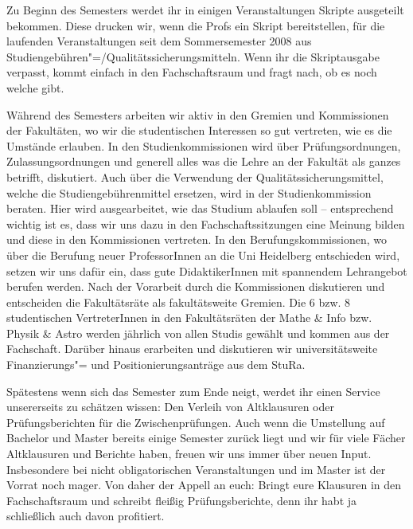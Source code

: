 Zu Beginn des Semesters werdet ihr in einigen Veranstaltungen Skripte ausgeteilt bekommen. Diese drucken wir, wenn die Profs ein Skript bereitstellen, für die laufenden Veranstaltungen seit dem Sommersemester 2008 aus Studiengebühren"=/Qualitätssicherungsmitteln. Wenn ihr die Skriptausgabe verpasst, kommt einfach in den Fachschaftsraum und fragt nach, ob es noch welche gibt.

Während des Semesters arbeiten wir aktiv in den Gremien und Kommissionen der Fakultäten, wo wir die studentischen Interessen so gut vertreten, wie es die Umstände erlauben. In den Studienkommissionen wird über Prüfungsordnungen, Zulassungsordnungen und generell alles was die Lehre an der Fakultät als ganzes betrifft, diskutiert. Auch über die Verwendung der Qualitätssicherungsmittel, welche die Studiengebührenmittel ersetzen, wird in der Studienkommission beraten. Hier wird ausgearbeitet, wie das Studium ablaufen soll -- entsprechend wichtig ist es, dass wir uns dazu in den Fachschaftssitzungen eine Meinung bilden und diese in den Kommissionen vertreten. In den Berufungskommissionen, wo über die Berufung neuer ProfessorInnen an die Uni Heidelberg entschieden wird, setzen wir uns dafür ein, dass gute DidaktikerInnen mit spannendem Lehrangebot berufen werden. Nach der Vorarbeit durch die Kommissionen diskutieren und entscheiden die Fakultätsräte als fakultätsweite Gremien. Die 6 bzw. 8 studentischen VertreterInnen in den Fakultätsräten der Mathe \& Info bzw. Physik \& Astro werden jährlich von allen Studis gewählt und kommen aus der Fachschaft. Darüber hinaus erarbeiten und diskutieren wir universitätsweite Finanzierungs"= und Positionierungsanträge aus dem \gls{StuRa}.

Spätestens wenn sich das Semester zum Ende neigt, werdet ihr einen Service unsererseits zu schätzen wissen: Den Verleih von Altklausuren oder Prüfungsberichten für die Zwischenprüfungen. Auch wenn die Umstellung auf Bachelor und Master bereits einige Semester zurück liegt und wir für viele Fächer Altklausuren und Berichte haben, freuen wir uns immer über neuen Input. Insbesondere bei nicht obligatorischen Veranstaltungen und im Master ist der Vorrat noch mager. Von daher der Appell an euch: Bringt eure Klausuren in den Fachschaftsraum und schreibt fleißig Prüfungsberichte, denn ihr habt ja schließlich auch davon profitiert.


